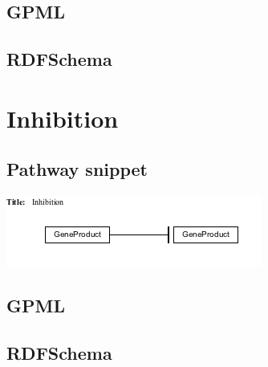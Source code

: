 \documentclass[]{article}
\begin{document}
\subsection{GPML}




\subsection{RDFSchema}

\section{Inhibition}
\subsection{Pathway snippet}
\includegraphics{inhibition.png}
\subsection{GPML}




\subsection{RDFSchema}



\end{document}
